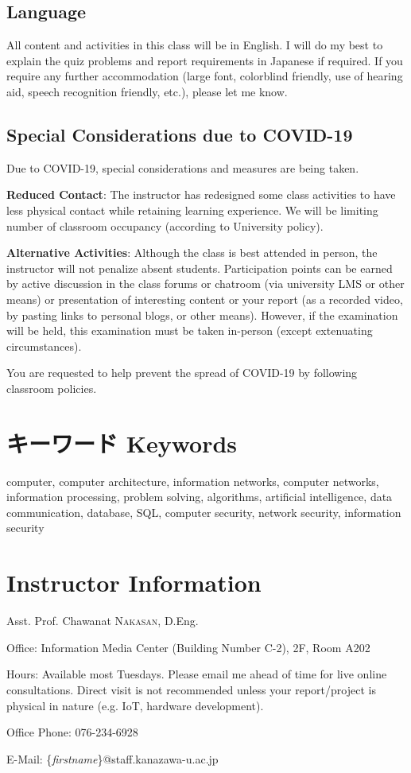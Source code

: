 \documentclass{article}
\begin{document}
\subsection{Language}

All content and activities in this class will be in English. I will do my best to explain the quiz problems and report requirements in Japanese if required. If you require any further accommodation (large font, colorblind friendly, use of hearing aid, speech recognition friendly, etc.), please let me know.

\subsection{Special Considerations due to COVID-19}

Due to COVID-19, special considerations and measures are being taken.

\textbf{Reduced Contact}: The instructor has redesigned some class activities to have less physical contact while retaining learning experience. We will be limiting number of classroom occupancy (according to University policy).

\textbf{Alternative Activities}: Although the class is best attended in person, the instructor will not penalize absent students. Participation points can be earned by active discussion in the class forums or chatroom (via university LMS or other means) or presentation of interesting content or your report (as a recorded video, by pasting links to personal blogs, or other means). However, if the examination will be held, this examination must be taken in-person (except extenuating circumstances).

You are requested to help prevent the spread of COVID-19 by following classroom policies.

\section{キーワード Keywords}
computer, computer architecture, information networks, computer networks, information processing, problem solving, algorithms, artificial intelligence, data communication, database, SQL, computer security, network security, information security

\section*{Instructor Information}
Asst. Prof. Chawanat \textsc{Nakasan}, D.Eng.

\smallskip\noindent
Office: Information Media Center (Building Number C-2), 2F, Room A202

\smallskip\noindent
Hours: Available most Tuesdays. Please email me ahead of time for live online consultations. Direct visit is not recommended unless your report/project is physical in nature (e.g. IoT, hardware development).

\smallskip\noindent
Office Phone: 076-234-6928

\smallskip\noindent
E-Mail: \{\textit{firstname}\}@staff.kanazawa-u.ac.jp
\end{document}
